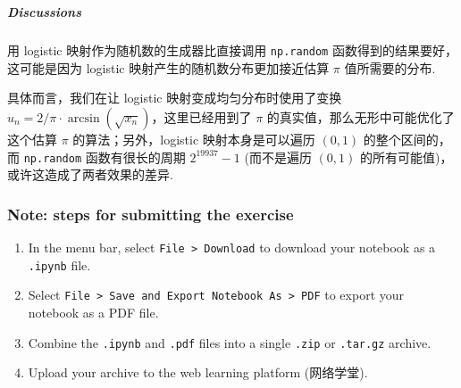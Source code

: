 \documentclass[11pt]{article}
\providecommand{\tightlist}{%
      \setlength{\itemsep}{0pt}\setlength{\parskip}{0pt}}
\begin{document}
    \begin{center}
    \end{center}
    { \hspace*{\fill} \\}
    
    \subparagraph{Discussions}\label{discussions}

用 logistic 映射作为随机数的生成器比直接调用 \texttt{np.random}
函数得到的结果要好，这可能是因为 logistic
映射产生的随机数分布更加接近估算 \(\pi\) 值所需要的分布.

具体而言，我们在让 logistic 映射变成均匀分布时使用了变换
\(u_n = 2/\pi\cdot\arcsin(\sqrt{x_n})\)，这里已经用到了 \(\pi\)
的真实值，那么无形中可能优化了这个估算 \(\pi\) 的算法；另外，logistic
映射本身是可以遍历 \((0,1)\) 的整个区间的，而 \texttt{np.random}
函数有很长的周期 \(2^{19937} - 1\) (而不是遍历 \((0,1)\)
的所有可能值)，或许这造成了两者效果的差异.

    \subsubsection{Note: steps for submitting the
exercise}\label{note-steps-for-submitting-the-exercise}

\begin{enumerate}
\def\labelenumi{\arabic{enumi}.}
\tightlist
\item
  In the menu bar, select \texttt{File\ \textgreater{}\ Download} to
  download your notebook as a \texttt{.ipynb} file.
\item
  Select
  \texttt{File\ \textgreater{}\ Save\ and\ Export\ Notebook\ As\ \textgreater{}\ PDF}
  to export your notebook as a PDF file.
\item
  Combine the \texttt{.ipynb} and \texttt{.pdf} files into a single
  \texttt{.zip} or \texttt{.tar.gz} archive.
\item
  Upload your archive to the web learning platform (网络学堂).
\end{enumerate}


    
    
    
\end{document}
